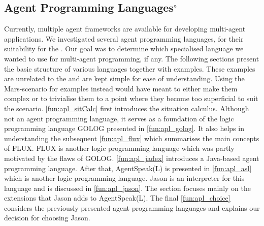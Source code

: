 \subsection[Agent Programming Languages]{Agent Programming Languages$^\circ$}
Currently, multiple agent frameworks are available for developing multi-agent applications.
We investigated several agent programming languages, for their suitability for the \mars{}.
Our goal was to determine which specialised language we wanted to use for multi-agent programming, if any.
The following sections present the basic structure of various languages together with examples.
These examples are unrelated to the \mars{} and are kept simple for ease of understanding.
Using the Mars-scenario for examples instead would have meant to either make them complex or to trivialise them to a point where they become too superficial to suit the scenario.
\autoref{fun:apl_sitCalc} first introduces the situation calculus.
Although not an agent programming language, it serves as a foundation of the logic programming language GOLOG presented in \autoref{fun:apl_golog}.
It also helps in understanding the subsequent \autoref{fun:apl_flux} which summarises the main concepts of FLUX.
FLUX is another logic programming language which was partly motivated by the flaws of GOLOG.
\autoref{fun:apl_jadex} introduces a Java-based agent programming language.
After that, AgentSpeak(L) is presented in \autoref{fun:apl_asl} which is another logic programming language.
Jason is an interpreter for this language and is discussed in \autoref{fun:apl_jason}.
The section focuses mainly on the extensions that Jason adds to AgentSpeak(L).
The final \autoref{fun:apl_choice} considers the previously presented agent programming languages and explains our decision for choosing Jason.














